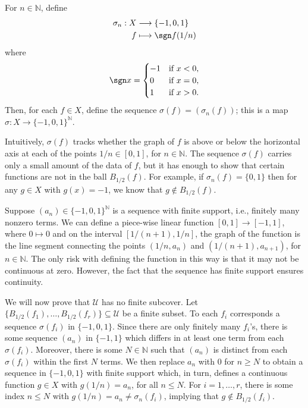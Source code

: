 \documentclass[12pt]{article}
\newcommand{\N}{\mathbb{N}}
\begin{document}
    For $n \in \N$, define
    \begin{align*}
        \sigma_n : X &\longrightarrow \{-1, 0, 1\} \\
            f &\longmapsto \sgn f(1/n)
    \end{align*}
    where
    \[
        \sgn x = \begin{cases}
            -1 &\text{if } x < 0, \\
            0 &\text{if } x = 0, \\
            1 &\text{if } x > 0.
        \end{cases}
    \]
    Then, for each $f \in X$, define the sequence $\sigma(f) = (\sigma_n(f))$; this is a map $\sigma : X \to \{-1, 0, 1\}^\N$.
    
    Intuitively, $\sigma(f)$ tracks whether the graph of $f$ is above or below the horizontal axis at each of the points $1/n \in [0, 1]$, for $n \in \N$. The sequence $\sigma(f)$ carries only a small amount of the data of $f$, but it has enough to show that certain functions are not in the ball $B_{1/2}(f)$. For example, if $\sigma_n(f) = \{0, 1\}$ then for any $g \in X$ with $g(x) = -1$, we know that $g \notin B_{1/2}(f)$.

    Suppose $(a_n) \in \{-1, 0, 1\}^\N$ is a sequence with finite support, i.e., finitely many nonzero terms. We can define a piece-wise linear function $[0, 1] \to [-1, 1]$, where $0 \mapsto 0$ and on the interval $[1/(n+1), 1/n]$, the graph of the function is the line segment connecting the points $(1/n, a_n)$ and $(1/(n+1), a_{n+1})$, for $n \in \N$. The only risk with defining the function in this way is that it may not be continuous at zero. However, the fact that the sequence has finite support ensures continuity.
    
    We will now prove that $\mathcal{U}$ has no finite subcover. Let $\{B_{1/2}(f_1), \dots, B_{1/2}(f_r)\} \subseteq \mathcal{U}$ be a finite subset. To each $f_i$ corresponds a sequence $\sigma(f_i)$ in $\{-1, 0, 1\}$. Since there are only finitely many $f_i$'s, there is some sequence $(a_n)$ in $\{-1, 1\}$ which differs in at least one term from each $\sigma(f_i)$. Moreover, there is some $N \in \N$ such that $(a_n)$ is distinct from each $\sigma(f_i)$ within the first $N$ terms. We then replace $a_n$ with $0$ for $n \geq N$ to obtain a sequence in $\{-1, 0, 1\}$ with finite support which, in turn, defines a continuous function $g \in X$ with $g(1/n) = a_n$, for all $n \leq N$. For $i = 1, \dots, r$, there is some index $n \leq N$ with $g(1/n) = a_n \neq \sigma_n(f_i)$, implying that $g \notin B_{1/2}(f_i)$.
\end{document}
